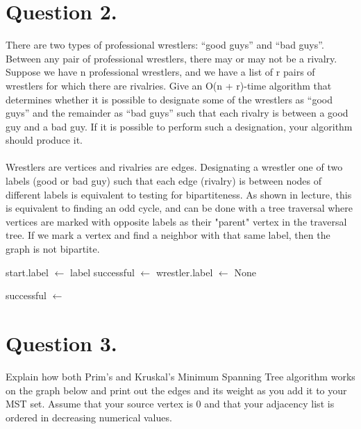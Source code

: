 \documentclass{article}
\begin{document}
\section{Question 2.}
There are two types of professional wrestlers: “good guys” and “bad guys”. Between any pair of professional wrestlers, there may or may not be a rivalry. Suppose we have n professional wrestlers, and we have a list of r pairs of wrestlers for which there are rivalries. Give an O(n + r)-time algorithm that determines whether it is possible to designate some of the wrestlers as “good guys” and the remainder as “bad guys” such that each rivalry is between a good guy and a bad guy. If it is possible to perform such a designation, your algorithm should produce it.
\\\\
Wrestlers are vertices and rivalries are edges. Designating a wrestler one of two labels (good or bad guy) such that each edge (rivalry) is between nodes of different labels is equivalent to testing for bipartiteness. As shown in lecture, this is equivalent to finding an odd cycle, and can be done with a tree traversal where vertices are marked with opposite labels as their "parent" vertex in the traversal tree. If we mark a vertex and find a neighbor with that same label, then the graph is not bipartite.
\begin{algorithm}
\begin{algorithmic}[1]

	\State start.label $\gets$ label
		 
			\State \Return {}
		\EndIf	
		\State successful $\gets$ 
			\State \Return {}
		\EndIf
	\EndFor
	\State \Return {}
\EndProcedure
\State
{}
	 
		\State wrestler.label $\gets$ None
	\EndFor
	
			\State successful $\gets$ 
				\State \Return {}
			\EndIf
		\EndIf
	\EndFor
	\State \Return {}
\EndProcedure


\end{algorithmic}
\end{algorithm}

\newpage
\section{Question 3.}
Explain how both Prim’s and Kruskal’s Minimum Spanning Tree algorithm works on the graph below and print out the edges and its weight as you add it to your MST set. Assume that your source vertex is 0 and that your adjacency list is ordered in decreasing numerical values.
\end{document}
